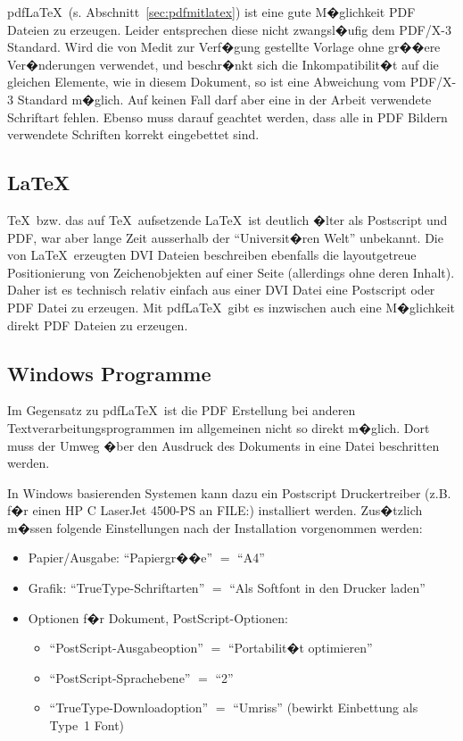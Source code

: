 pdf\LaTeX\  (s. Abschnitt~\ref{sec:pdfmitlatex}) ist eine gute M�glichkeit PDF Dateien zu
erzeugen. Leider entsprechen diese nicht zwangsl�ufig dem PDF/X-3 Standard. Wird die von Medit zur
Verf�gung gestellte Vorlage ohne gr��ere Ver�nderungen verwendet, und beschr�nkt sich die
Inkompatibilit�t auf die gleichen Elemente, wie in diesem Dokument, so ist eine Abweichung vom
PDF/X-3 Standard m�glich. Auf keinen Fall darf aber eine in der Arbeit verwendete Schriftart
fehlen. Ebenso muss darauf geachtet werden, dass alle in PDF Bildern verwendete Schriften korrekt eingebettet sind.

\subsection{\LaTeX\label{sec:pdfmitlatex}}
\TeX\  bzw. das auf \TeX\  aufsetzende \LaTeX\  ist deutlich �lter als Postscript
und PDF, war aber lange Zeit ausserhalb der "`Universit�ren Welt"' unbekannt. Die von \LaTeX\
erzeugten DVI Dateien beschreiben ebenfalls die layoutgetreue Positionierung von Zeichenobjekten
auf einer Seite (allerdings ohne deren Inhalt). Daher ist es technisch relativ einfach aus einer
DVI Datei eine Postscript oder PDF Datei zu erzeugen. Mit pdf\LaTeX\  gibt es inzwischen auch
eine M�glichkeit direkt PDF Dateien zu erzeugen.

\subsection{Windows Programme}
Im Gegensatz zu pdf\LaTeX\  ist die PDF Erstellung bei anderen Textverarbeitungsprogrammen im
allgemeinen nicht so direkt m�glich. Dort muss der Umweg �ber den Ausdruck des Dokuments in eine
Datei beschritten werden.

In Windows basierenden Systemen kann dazu ein Postscript Druckertreiber (z.B. f�r einen HP C
LaserJet 4500-PS an FILE:) installiert werden. Zus�tzlich m�ssen folgende Einstellungen nach der
Installation vorgenommen werden:
\begin{itemize}
                \item Papier/Ausgabe: "`Papiergr��e"' $=$ "`A4"'
                \item Grafik: "`TrueType-Schriftarten"' $=$ "`Als Softfont in den Drucker laden"'
                \item Optionen f�r Dokument, PostScript-Optionen:
                      \begin{itemize}
                        \item "`PostScript-Ausgabeoption"' $=$ "`Portabilit�t optimieren"'
                        \item "`PostScript-Sprachebene"' $=$ "`2"'
                        \item "`TrueType-Downloadoption"' $=$ "`Umriss"' (bewirkt Einbettung als Type~1 Font)
                      \end{itemize}
\end{itemize}

